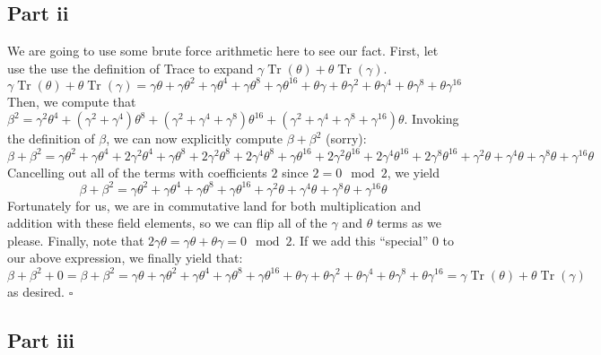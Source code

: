 \documentclass[letterpaper]{article}
\newcommand*{\QED}{\hfill\ensuremath{\square}}%
\DeclareMathOperator{\tr}{Tr}
\begin{document}
\subsection{Part ii}
\label{subs:1Partii}

We are going to use some brute force arithmetic here to see our fact.
First, let use the use the definition of Trace to expand $ \gamma \tr{(\theta)} + \theta \tr{(\gamma)} $.
\[
\gamma \tr{(\theta)} + \theta \tr{(\gamma)} = \gamma \theta + \gamma \theta^2 + \gamma \theta^4 + \gamma \theta^8 + \gamma \theta^{16} + \theta \gamma + \theta \gamma^2 + \theta \gamma^4 + \theta \gamma^8 + \theta \gamma^{16}
\]
Then, we compute that $ \beta^2 = \gamma^2 \theta^4 + (\gamma^2 + \gamma^4)\theta^8 + (\gamma^2 + \gamma^4 + \gamma^8) \theta^{16} + (\gamma^2 + \gamma^4 + \gamma^8 + \gamma^{16}) \theta $.
Invoking the definition of $ \beta $, we can now explicitly compute $ \beta + \beta^2 $ (sorry):
\[
\beta + \beta^2 = \gamma \theta^2 + \gamma \theta^4 + 2 \gamma^2 \theta^4 + \gamma \theta^8 + 2 \gamma^2 \theta^8 + 2 \gamma^4 \theta^8 + \gamma \theta^{16} + 2 \gamma^2 \theta^{16} + 2 \gamma^4 \theta^{16} + 2 \gamma^8 \theta^{16} + \gamma^2 \theta + \gamma^4 \theta + \gamma^8 \theta + \gamma^{16} \theta
\]
Cancelling out all of the terms with coefficients $ 2 $ since $ 2 = 0 \mod{2} $, we yield
\[
\beta + \beta^2 = \gamma \theta^2 + \gamma \theta^4 + \gamma \theta^8 + \gamma \theta^{16} + \gamma^2 \theta + \gamma^4 \theta + \gamma^8 \theta + \gamma^{16} \theta
\]
Fortunately for us, we are in commutative land for both multiplication and addition with these field elements, so we can flip all of the $ \gamma $ and $ \theta $ terms as we please.
Finally, note that $ 2 \gamma \theta = \gamma \theta + \theta \gamma = 0 \mod{2} $.
If we add this ``special'' $ 0 $ to our above expression, we finally yield that:
\[
\beta + \beta^2 + 0 = \beta + \beta^2 = \gamma \theta + \gamma \theta^2 + \gamma \theta^4 + \gamma \theta^8 + \gamma \theta^{16} + \theta \gamma + \theta \gamma^2 + \theta \gamma^4 + \theta \gamma^8 + \theta \gamma^{16} = \gamma \tr{(\theta)} + \theta \tr{(\gamma)}
\]
as desired.
\QED{}

\subsection{Part iii}
\label{subs:1Partiii}
\end{document}
